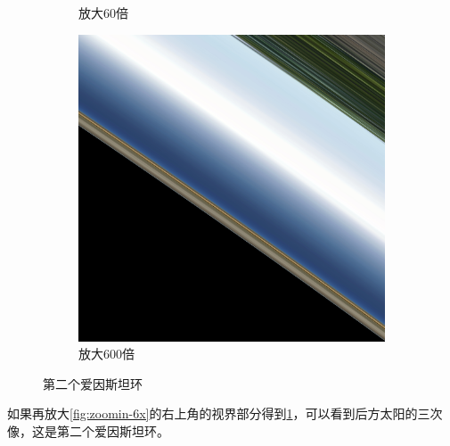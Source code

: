 \begin{figure}[H]
\begin{subfigure}{.33\textwidth}
        \caption{放大60倍}
        \label{fig:zoomin-60x} %
    \end{subfigure}
    \begin{subfigure}{.33\textwidth}
        \centering
        \includegraphics[width=.95\linewidth]{images/zoomin_600x.png}
        \caption{放大600倍}
        \label{fig:zoomin-600x}
    \end{subfigure}%
    \caption{第二个爱因斯坦环}
\end{figure}


如果再放大\ref{fig:zoomin-6x}的右上角的视界部分得到\ref{fig:zoomin-60x}，可以看到后方太阳的三次像，这是第二个爱因斯坦环。

